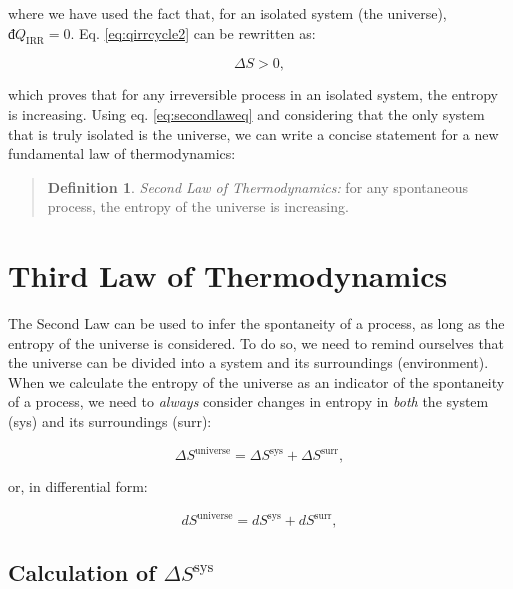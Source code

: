 \documentclass[
  9pt,
]{extbook}
\theoremstyle{definition}
\newtheorem{definition}{Definition}[chapter]
\theoremstyle{definition}
\theoremstyle{definition}
\theoremstyle{remark}
\begin{document}
where we have used the fact that, for an isolated system (the universe), \(đQ_{\mathrm{IRR}}=0\). Eq. \eqref{eq:qirrcycle2} can be rewritten as:

\begin{equation}
\Delta S > 0,
\label{eq:secondlaweq}
\end{equation}

which proves that for any irreversible process in an isolated system, the entropy is increasing. Using eq. \eqref{eq:secondlaweq} and considering that the only system that is truly isolated is the universe, we can write a concise statement for a new fundamental law of thermodynamics:

\begin{quote}
\begin{definition}
\protect\hypertarget{def:secondlawdef}{}{\label{def:secondlawdef} }\emph{Second Law of Thermodynamics:} for any spontaneous process, the entropy of the universe is increasing.
\end{definition}
\end{quote}

\renewcommand*{\standardstate}{{-\kern-6pt{\ominus}\kern-6pt-}}

\hypertarget{thirdlaw}{%
\chapter{Third Law of Thermodynamics}\label{thirdlaw}}

The Second Law can be used to infer the spontaneity of a process, as long as the entropy of the universe is considered. To do so, we need to remind ourselves that the universe can be divided into a system and its surroundings (environment). When we calculate the entropy of the universe as an indicator of the spontaneity of a process, we need to \emph{always} consider changes in entropy in \emph{both} the system (sys) and its surroundings (surr):

\begin{equation}
\Delta S^{\mathrm{universe}} = \Delta S^{\mathrm{sys}} + \Delta S^{\mathrm{surr}},
\label{eq:dsuniv}
\end{equation}

or, in differential form:

\begin{equation}
d S^{\mathrm{universe}} = d S^{\mathrm{sys}} + d S^{\mathrm{surr}},
\label{eq:dsunivd}
\end{equation}

\hypertarget{dssys}{%
\section{\texorpdfstring{Calculation of \(\Delta S^{\mathrm{sys}}\)}{Calculation of \textbackslash Delta S\^{}\{\textbackslash mathrm\{sys\}\}}}\label{dssys}}
\end{document}
